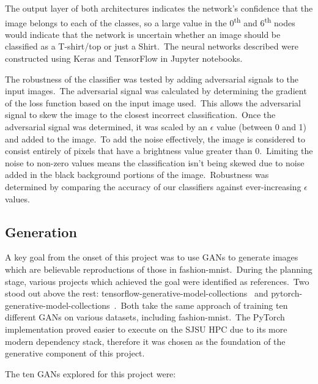 \documentclass[conference]{IEEEtran}
\begin{document}
    The output layer of both architectures indicates the network's confidence that the image belongs to each of the classes, so a large value in the 0\textsuperscript{th} and 6\textsuperscript{th} nodes would indicate that the network is uncertain whether an image should be classified as a T-shirt/top or just a Shirt.\ The neural networks described were constructed using Keras and TensorFlow in Jupyter notebooks.

    The robustness of the classifier was tested by adding adversarial signals to the input images.\ The adversarial signal was calculated by determining the gradient of the loss function based on the input image used.\ This allows the adversarial signal to skew the image to the closest incorrect classification.\ Once the adversarial signal was determined, it was scaled by an \(\epsilon\) value (between 0 and 1) and added to the image.\ To add the noise effectively, the image is considered to consist entirely of pixels that have a brightness value greater than 0.\ Limiting the noise to non-zero values means the classification isn't being skewed due to noise added in the black background portions of the image.\ Robustness was determined by comparing the accuracy of our classifiers against ever-increasing \(\epsilon\) values.

    \subsection{Generation}\label{subsec:implementation-generation}

    A key goal from the onset of this project was to use GANs to generate images which are believable reproductions of those in fashion-mnist.\ During the planning stage, various projects which achieved the goal were identified as references.\ Two stood out above the rest: tensorflow-generative-model-collections~\cite{tensorflow-generative-model-collections} and pytorch-generative-model-collections~\cite{original-pytorch-generative-model-collections}.\ Both take the same approach of training ten different GANs on various datasets, including fashion-mnist.\ The PyTorch implementation proved easier to execute on the SJSU HPC due to its more modern dependency stack, therefore it was chosen as the foundation of the generative component of this project.

    The ten GANs explored for this project were:
\end{document}
